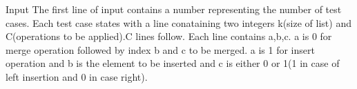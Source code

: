 Input  
The first line of input contains a number representing the number of test cases. Each test case states with a line conataining two integers k(size of list) and C(operations to be applied).C lines follow. Each line contains a,b,c. a is 0 for merge operation followed by index b and c to be merged. a is 1 for insert operation and b is the element to be inserted and c is either 0 or 1(1 in case of left insertion and 0 in case right).